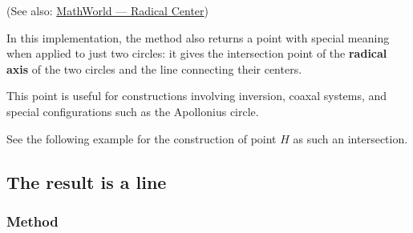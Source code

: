 \noindent
(See also: \href{https://mathworld.wolfram.com/RadicalCenter.html}{MathWorld — Radical Center})

\medskip
\noindent
In this implementation, the method  also returns a point with special meaning when applied to just two circles: it gives the intersection point of the \textbf{radical axis} of the two circles and the line connecting their centers.

\medskip
\noindent
This point is useful for constructions involving inversion, coaxal systems, and special configurations such as the Apollonius circle.

\medskip
\noindent
See the following example for the construction of point $H$ as such an intersection.

\vspace{1em}



\begin{tkzexample}[latex=.5\textwidth]
\begin{center}
\end{center}
\end{tkzexample}





\subsection{The result is a line}

\subsubsection{Method }
\label{ssub:method_circle_tangent__at_pt}

